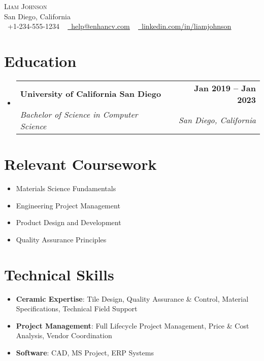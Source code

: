 \documentclass[letterpaper,11pt]{article}
\makeatletter
\newcommand{\resumeItem}[1]{\item\small{#1 \vspace{-2pt}}}
\newcommand{\resumeSubheading}[4]{
  \vspace{-2pt}\item
    \begin{tabular*}{1.0\textwidth}[t]{l@{\extracolsep{\fill}}r}
      \textbf{#1} & \textbf{\small #2} \\
      \textit{\small#3} & \textit{\small #4} \\
    \end{tabular*}\vspace{-7pt}
}
\newcommand{\resumeSubHeadingListStart}{\begin{itemize}[leftmargin=0in, label={}]}
\newcommand{\resumeSubHeadingListEnd}{\end{itemize}}
\newcommand{\resumeItemListStart}{\begin{itemize}}
\newcommand{\resumeItemListEnd}{\end{itemize}\vspace{-5pt}}
\makeatother
\begin{document}
\begin{center}
    {\Huge \scshape Liam Johnson} \\ \vspace{4pt}
    San Diego, California \\ \vspace{4pt}
    \small \raisebox{-0.1\height}\faPhone\ +1-234-555-1234 ~ 
    \href{mailto:help@enhancv.com}{\raisebox{-0.2\height}\faEnvelope\ \underline{help@enhancv.com}} ~ 
    \href{https://linkedin.com/in/liamjohnson}{\raisebox{-0.2\height}\faLinkedin\ \underline{linkedin.com/in/liamjohnson}}
    \vspace{-8pt}
\end{center}

\section{Education}
\resumeSubHeadingListStart
  \resumeSubheading
    {University of California San Diego}{Jan 2019 -- Jan 2023}
    {Bachelor of Science in Computer Science}{San Diego, California}
\resumeSubHeadingListEnd

\section{Relevant Coursework}
\resumeItemListStart
    \resumeItem{Materials Science Fundamentals}
    \resumeItem{Engineering Project Management}
    \resumeItem{Product Design and Development}
    \resumeItem{Quality Assurance Principles}
\resumeItemListEnd

\section{Technical Skills}
\begin{itemize}[leftmargin=0.35in, itemsep=0pt, label={\tiny$\bullet$}]
    \item \textbf{Ceramic Expertise}: Tile Design, Quality Assurance \& Control, Material Specifications, Technical Field Support
    \item \textbf{Project Management}: Full Lifecycle Project Management, Price \& Cost Analysis, Vendor Coordination
    \item \textbf{Software}: CAD, MS Project, ERP Systems
\end{itemize}
\end{document}
